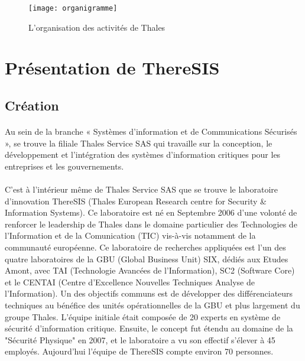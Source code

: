 
\begin{figure}[!htb]
  \centering
  \texttt{[image: organigramme]}
  \caption{L’organisation des activit\'es de Thales}
  \label{fig:organigramme}
\end{figure}


\section{Pr\'esentation de ThereSIS}

\subsection{Cr\'eation}

\paragraph{} Au sein de la branche « Systèmes d’information et de Communications S\'ecuris\'es », se trouve la filiale Thales Service SAS qui travaille sur la conception, le d\'eveloppement et l’int\'egration des systèmes d’information critiques pour les entreprises et les gouvernements.

\paragraph{} C’est à l’int\'erieur même de Thales Service SAS que se trouve le laboratoire d’innovation ThereSIS (Thales European Research centre for Security \& Information Systems). Ce laboratoire est n\'e en Septembre 2006 d’une volont\'e de renforcer le leadership de Thales dans le domaine particulier des Technologies de l'Information et de la Comunication (TIC) vis-à-vis notamment de la communaut\'e europ\'eenne. Ce laboratoire de recherches appliqu\'ees est l’un des quatre laboratoires de la GBU (Global Business Unit) SIX, d\'edi\'es aux Etudes Amont, avec TAI (Technologie Avanc\'ees de l’Information), SC2 (Software Core) et le CENTAI (Centre d’Excellence Nouvelles Techniques Analyse de l’Information). Un des objectifs communs est de d\'evelopper des diff\'erenciateurs techniques au b\'en\'efice des unit\'es op\'erationnelles de la GBU et plus largement du groupe Thales.  L’\'equipe initiale \'etait compos\'ee de 20 experts en système de s\'ecurit\'e d’information critique. Ensuite, le concept fut \'etendu au domaine de la "S\'ecurit\'e Physique" en 2007, et le laboratoire a vu son effectif s’\'elever à 45 employ\'es. Aujourd’hui l’\'equipe de ThereSIS compte environ 70 personnes.


